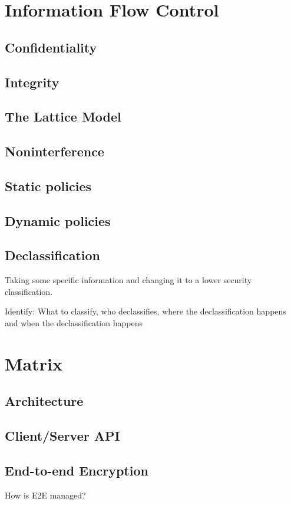 \section{Information Flow Control} %

\subsection{Confidentiality}

\subsection{Integrity}

\subsection{The Lattice Model}

\subsection{Noninterference}

\subsection{Static policies}

\subsection{Dynamic policies}


\subsection{Declassification}
Taking some specific information and changing it to a lower security classification.

Identify: What to classify, who declassifies, where the declassification happens and when the declassification happens


\section{Matrix} %

\subsection{Architecture}

\subsection{Client/Server API}

\subsection{End-to-end Encryption}
How is E2E managed?